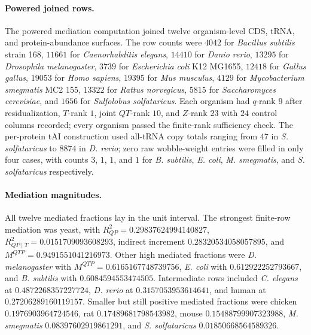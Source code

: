 \paragraph{Powered joined rows.}
The powered mediation computation joined twelve organism-level CDS, tRNA, and protein-abundance surfaces.  The row counts were $4042$ for \textit{Bacillus subtilis} strain 168, $11661$ for \textit{Caenorhabditis elegans}, $14410$ for \textit{Danio rerio}, $13295$ for \textit{Drosophila melanogaster}, $3739$ for \textit{Escherichia coli} K12 MG1655, $12418$ for \textit{Gallus gallus}, $19053$ for \textit{Homo sapiens}, $19395$ for \textit{Mus musculus}, $4129$ for \textit{Mycobacterium smegmatis} MC2 155, $13322$ for \textit{Rattus norvegicus}, $5815$ for \textit{Saccharomyces cerevisiae}, and $1656$ for \textit{Sulfolobus solfataricus}.  Each organism had $q$-rank $9$ after residualization, $T$-rank $1$, joint $QT$-rank $10$, and $Z$-rank $23$ with $24$ control columns recorded; every organism passed the finite-rank sufficiency check.  The per-protein tAI construction used all-tRNA copy totals ranging from $47$ in \textit{S. solfataricus} to $8874$ in \textit{D. rerio}; zero raw wobble-weight entries were filled in only four cases, with counts $3$, $1$, $1$, and $1$ for \textit{B. subtilis}, \textit{E. coli}, \textit{M. smegmatis}, and \textit{S. solfataricus} respectively.

\paragraph{Mediation magnitudes.}
All twelve mediated fractions lay in the unit interval.  The strongest finite-row mediation was yeast, with $R^2_{QP}=0.29837624994140827$, $R^2_{QP\mid T}=0.0151709093608293$, indirect increment $0.28320534058057895$, and $M^{QTP}=0.9491551041216973$.  Other high mediated fractions were \textit{D. melanogaster} with $M^{QTP}=0.6165167748739756$, \textit{E. coli} with $0.612922252793667$, and \textit{B. subtilis} with $0.6084594553474505$.  Intermediate rows included \textit{C. elegans} at $0.4872268357227724$, \textit{D. rerio} at $0.3157053953614641$, and human at $0.27206289160119157$.  Smaller but still positive mediated fractions were chicken $0.1976903964724546$, rat $0.17489681798543982$, mouse $0.15488799907323988$, \textit{M. smegmatis} $0.08397602919861291$, and \textit{S. solfataricus} $0.01850668564589326$.

